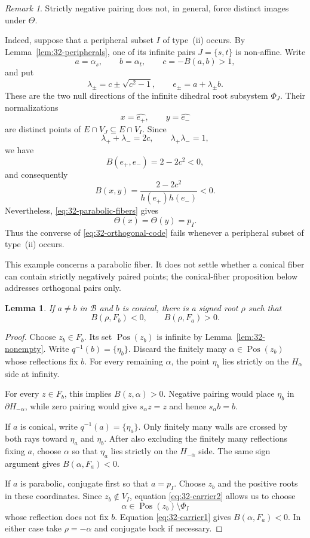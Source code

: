\documentclass[11pt,reqno]{amsart}
\theoremstyle{plain}
\newtheorem{lemma}[theorem]{Lemma}
\theoremstyle{definition}
\theoremstyle{remark}
\newtheorem{remark}[theorem]{Remark}
\numberwithin{equation}{section}
\DeclareMathOperator{\Pos}{Pos}
\begin{document}
\begin{remark}\label{rem:32-negative-same-image}
Strictly negative pairing does not, in general, force distinct
images under $\Theta$.

Indeed, suppose that a peripheral subset $I$ of
type~\textup{(ii)} occurs. By Lemma~\ref{lem:32-peripherals},
one of its infinite pairs $J=\{s,t\}$ is non-affine.
Write
\[
    a=\alpha_s,\qquad b=\alpha_t,\qquad c=-B(a,b)>1,
\]
and put
\[
    \lambda_\pm=c\pm\sqrt{c^2-1},
    \qquad
    e_\pm=a+\lambda_\pm b.
\]
These are the two null directions of the infinite dihedral
root subsystem $\Phi_J$. Their normalizations
\[
    x=\widehat{e_+},
    \qquad
    y=\widehat{e_-}
\]
are distinct points of $E\cap V_J\subseteq E\cap V_I$.
Since
\[
    \lambda_++\lambda_-=2c,
    \qquad
    \lambda_+\lambda_-=1,
\]
we have
\[
    B(e_+,e_-)=2-2c^2<0,
\]
and consequently
\[
    B(x,y)=\frac{2-2c^2}{h(e_+)h(e_-)}<0.
\]
Nevertheless, \eqref{eq:32-parabolic-fibers} gives
\[
    \Theta(x)=\Theta(y)=p_I.
\]
Thus the converse of \eqref{eq:32-orthogonal-code} fails
whenever a peripheral subset of type~\textup{(ii)} occurs.

This example concerns a parabolic fiber. It does not settle
whether a conical fiber can contain strictly negatively paired
points; the conical-fiber proposition below addresses
orthogonal pairs only.
\end{remark}
\begin{lemma}\label{lem:32-separation}
If $a\ne b$ in $\mathcal B$ and $b$ is conical,
there is a signed root $\rho$ such that
\[
    B(\rho,F_b)<0,\qquad B(\rho,F_a)>0.
\]
\end{lemma}

\begin{proof}
Choose $z_b\in F_b$.
Its set $\Pos(z_b)$ is infinite by
Lemma~\ref{lem:32-nonempty}.
Write $q^{-1}(b)=\{\eta_b\}$.
Discard the finitely many $\alpha\in\Pos(z_b)$
whose reflections fix $b$.
For every remaining $\alpha$, the point $\eta_b$
lies strictly on the $H_\alpha$ side at infinity.

For every $z\in F_b$, this implies $B(z,\alpha)>0$.
Negative pairing would place $\eta_b$ in
$\partial H_{-\alpha}$, while zero pairing would give
$s_\alpha z=z$ and hence $s_\alpha b=b$.

If $a$ is conical, write $q^{-1}(a)=\{\eta_a\}$.
Only finitely many walls are crossed by both rays
toward $\eta_a$ and $\eta_b$.
After also excluding the finitely many reflections fixing
$a$, choose $\alpha$ so that $\eta_a$ lies strictly
on the $H_{-\alpha}$ side.
The same sign argument gives $B(\alpha,F_a)<0$.

If $a$ is parabolic, conjugate first so that $a=p_I$.
Choose $z_b$ and the positive roots in these coordinates.
Since $z_b\notin V_I$, equation
\eqref{eq:32-carrier2} allows us to choose
\[
    \alpha\in\Pos(z_b)\setminus\Phi_I
\]
whose reflection does not fix $b$.
Equation \eqref{eq:32-carrier1} gives
$B(\alpha,F_a)<0$.
In either case take $\rho=-\alpha$ and conjugate back
if necessary.
\end{proof}
\end{document}
